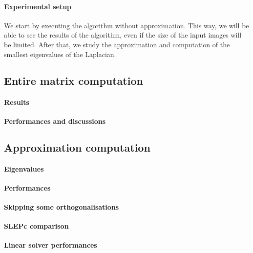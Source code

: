 \paragraph{Experimental setup}


\paragraph{}
We start by executing the algorithm without approximation.
This way, we will be able to see the results of the algorithm, even if the size of the input images will be limited.
After that, we study the approximation and computation of the smallest eigenvalues of the Laplacian.

\subsection{Entire matrix computation}

\paragraph{Results}


\paragraph{Performances and discussions}


\subsection{Approximation computation}

\paragraph{Eigenvalues}


\paragraph{Performances}


\paragraph{Skipping some orthogonalisations}


\paragraph{SLEPc comparison}


\paragraph{Linear solver performances}

